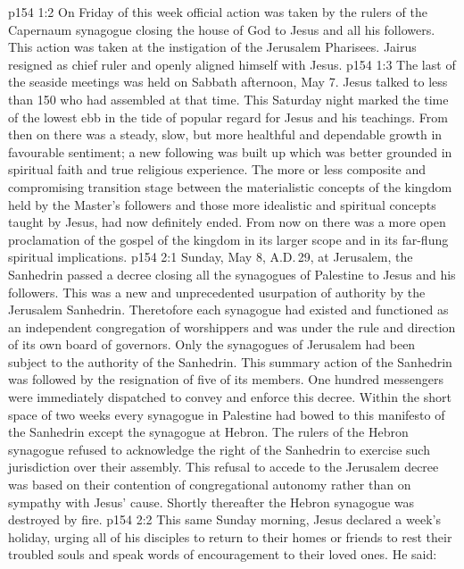 \vs p154 1:2 On Friday of this week official action was taken by the rulers of the Capernaum synagogue closing the house of God to Jesus and all his followers. This action was taken at the instigation of the Jerusalem Pharisees. Jairus resigned as chief ruler and openly aligned himself with Jesus.
\vs p154 1:3 The last of the seaside meetings was held on Sabbath afternoon, May 7. Jesus talked to less than 150 who had assembled at that time. This Saturday night marked the time of the lowest ebb in the tide of popular regard for Jesus and his teachings. From then on there was a steady, slow, but more healthful and dependable growth in favourable sentiment; a new following was built up which was better grounded in spiritual faith and true religious experience. The more or less composite and compromising transition stage between the materialistic concepts of the kingdom held by the Master’s followers and those more idealistic and spiritual concepts taught by Jesus, had now definitely ended. From now on there was a more open proclamation of the gospel of the kingdom in its larger scope and in its far\hyp{}flung spiritual implications.
\vs p154 2:1 Sunday, May 8, A.D.\,29, at Jerusalem, the Sanhedrin passed a decree closing all the synagogues of Palestine to Jesus and his followers. This was a new and unprecedented usurpation of authority by the Jerusalem Sanhedrin. Theretofore each synagogue had existed and functioned as an independent congregation of worshippers and was under the rule and direction of its own board of governors. Only the synagogues of Jerusalem had been subject to the authority of the Sanhedrin. This summary action of the Sanhedrin was followed by the resignation of five of its members. One hundred messengers were immediately dispatched to convey and enforce this decree. Within the short space of two weeks every synagogue in Palestine had bowed to this manifesto of the Sanhedrin except the synagogue at Hebron. The rulers of the Hebron synagogue refused to acknowledge the right of the Sanhedrin to exercise such jurisdiction over their assembly. This refusal to accede to the Jerusalem decree was based on their contention of congregational autonomy rather than on sympathy with Jesus’ cause. Shortly thereafter the Hebron synagogue was destroyed by fire.
\vs p154 2:2 \pc This same Sunday morning, Jesus declared a week’s holiday, urging all of his disciples to return to their homes or friends to rest their troubled souls and speak words of encouragement to their loved ones. He said: 
